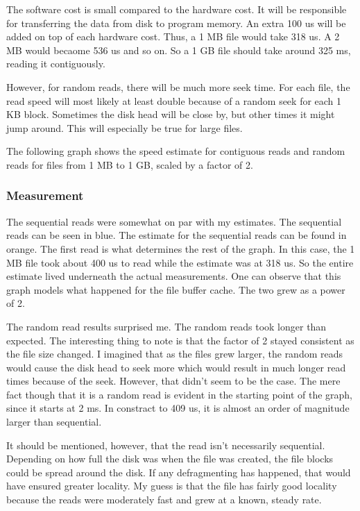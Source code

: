 \documentclass[paper=a4, fontsize=11pt]{scrartcl}
\numberwithin{equation}{section}        %
\numberwithin{figure}{section}          %
\numberwithin{table}{section}               %
\begin{document}
The software cost is small compared to the hardware cost.  It will be responsible for transferring the data from disk to program memory.  An extra 100 us will be added on top of each hardware cost.  Thus, a 1 MB file would take 318 us.  A 2 MB would becaome 536 us and so on.  So a 1 GB file should take around 325 ms, reading it contiguously.

However, for random reads, there will be much more seek time.  For each file, the read speed will most likely at least double because of a random seek for each 1 KB block.  Sometimes the disk head will be close by, but other times it might jump around.  This will especially be true for large files.

The following graph shows the speed estimate for contiguous reads and random reads for files from 1 MB to 1 GB, scaled by a factor of 2.

\subsubsection{Measurement}

The sequential reads were somewhat on par with my estimates.  The sequential reads can be seen in blue.  The estimate for the sequential reads can be found in orange.  The first read is what determines the rest of the graph.  In this case, the 1 MB file took about 400 us to read while the estimate was at 318 us.  So the entire estimate lived underneath the actual measurements.  One can observe that this graph models what happened for the file buffer cache.  The two grew as a power of 2.

The random read results surprised me.  The random reads took longer than expected.  The interesting thing to note is that the factor of 2 stayed consistent as the file size changed.  I imagined that as the files grew larger, the random reads would cause the disk head to seek more which would result in much longer read times because of the seek.  However, that didn't seem to be the case.  The mere fact though that it is a random read is evident in the starting point of the graph, since it starts at 2 ms.  In constract to 409 us, it is almost an order of magnitude larger than sequential.

It should be mentioned, however, that the read isn't necessarily sequential.  Depending on how full the disk was when the file was created, the file blocks could be spread around the disk.  If any defragmenting has happened, that would have ensured greater locality.  My guess is that the file has fairly good locality because the reads were moderately fast and grew at a known, steady rate. 
\end{document}
